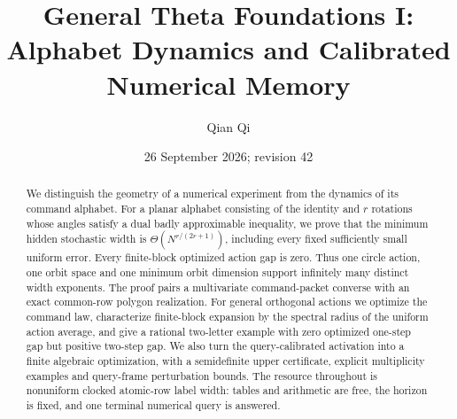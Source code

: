 \documentclass[11pt]{amsart}
\title[Alphabet dynamics and numerical memory]{General Theta Foundations I:\\Alphabet Dynamics and Calibrated Numerical Memory}
\author{Qian Qi}
\date{26 September 2026; revision 42}
\numberwithin{equation}{section}
\theoremstyle{definition}
\begin{document}
\begin{abstract}
We distinguish the geometry of a numerical experiment from the dynamics of its command alphabet.
For a planar alphabet consisting of the identity and $r$ rotations whose angles satisfy a dual badly approximable inequality, we prove that the minimum hidden stochastic width is $\Theta(N^{r/(2r+1)})$, including every fixed sufficiently small uniform error. Every finite-block optimized action gap is zero. Thus one circle action, one orbit space and one minimum orbit dimension support infinitely many distinct width exponents. The proof pairs a multivariate command-packet converse with an exact common-row polygon realization.
For general orthogonal actions we optimize the command law, characterize finite-block expansion by the spectral radius of the uniform action average, and give a rational two-letter example with zero optimized one-step gap but positive two-step gap.
We also turn the query-calibrated activation into a finite algebraic optimization, with a semidefinite upper certificate, explicit multiplicity examples and query-frame perturbation bounds.
The resource throughout is nonuniform clocked atomic-row label width: tables and arithmetic are free, the horizon is fixed, and one terminal numerical query is answered.
\end{abstract}
\maketitle
\enlargethispage{6pt}








\appendix




\end{document}
